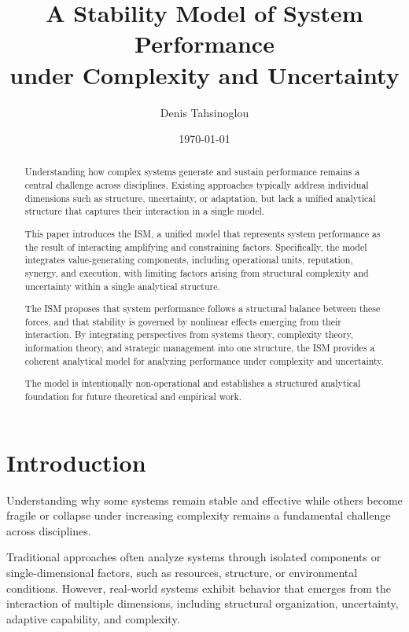 \documentclass[11pt,a4paper]{article}
\title{A Stability Model of System Performance \\
	under Complexity and Uncertainty}
\author{Denis Tahsinoglou}
\date{\today}
\theoremstyle{definition}
\begin{document}
\begin{acronym}[ISM]
\end{acronym}

\maketitle

\begin{abstract}

	Understanding how complex systems generate and sustain performance remains a central challenge across disciplines.
	Existing approaches typically address individual dimensions such as structure, uncertainty, or adaptation, but lack a unified analytical structure that captures their interaction in a single model.

	This paper introduces the \ac{ISM}, a unified model that represents system performance as the result of interacting amplifying and constraining factors.
	Specifically, the model integrates value-generating components, including operational units, reputation, synergy, and execution, with limiting factors arising from structural complexity and uncertainty within a single analytical structure.

	The \ac{ISM} proposes that system performance follows a structural balance between these forces, and that stability is governed by nonlinear effects emerging from their interaction.
	By integrating perspectives from systems theory, complexity theory, information theory, and strategic management into one structure, the \ac{ISM} provides a coherent analytical model for analyzing performance under complexity and uncertainty.
	
	The model is intentionally non-operational and establishes a structured analytical foundation for future theoretical and empirical work.
	
\end{abstract}


\section{Introduction}
\label{sec:introduction}

Understanding why some systems remain stable and effective while others become fragile or collapse under increasing complexity remains a fundamental challenge across disciplines.

Traditional approaches often analyze systems through isolated components or single-dimensional factors, such as resources, structure, or environmental conditions.
However, real-world systems exhibit behavior that emerges from the interaction of multiple dimensions, including structural organization, uncertainty, adaptive capability, and complexity.
\end{document}
